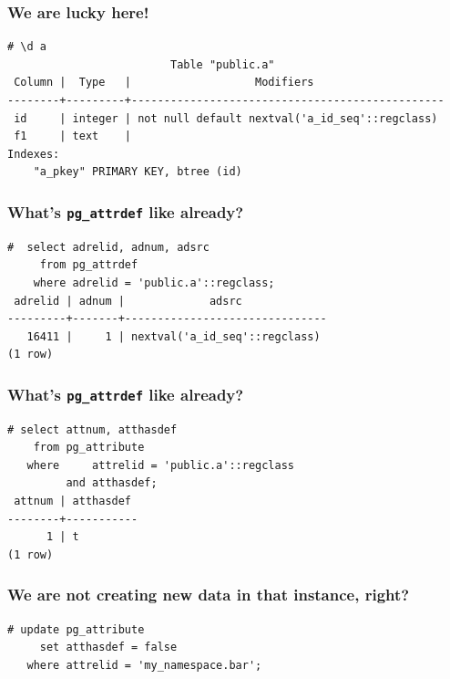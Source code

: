 \documentclass{beamer}
\begin{document}
\begin{frame}[fragile]
  \frametitle{We are lucky here!}

  \vfill

  \begin{verbatim}
# \d a
                         Table "public.a"
 Column |  Type   |                   Modifiers                    
--------+---------+------------------------------------------------
 id     | integer | not null default nextval('a_id_seq'::regclass)
 f1     | text    | 
Indexes:
    "a_pkey" PRIMARY KEY, btree (id)
  \end{verbatim}
\end{frame}

\begin{frame}[fragile]
  \frametitle{What's \texttt{pg\_attrdef} like already?}

  \begin{verbatim}
#  select adrelid, adnum, adsrc
     from pg_attrdef
    where adrelid = 'public.a'::regclass;
 adrelid | adnum |             adsrc             
---------+-------+-------------------------------
   16411 |     1 | nextval('a_id_seq'::regclass)
(1 row)
  \end{verbatim}
\end{frame}

\begin{frame}[fragile]
  \frametitle{What's \texttt{pg\_attrdef} like already?}

  \begin{verbatim}
# select attnum, atthasdef
    from pg_attribute
   where     attrelid = 'public.a'::regclass
         and atthasdef;
 attnum | atthasdef 
--------+-----------
      1 | t
(1 row)
  \end{verbatim}
\end{frame}

\begin{frame}[fragile]
  \frametitle{We are not creating new data in that instance, right?}

  \begin{verbatim}
# update pg_attribute
     set atthasdef = false
   where attrelid = 'my_namespace.bar';
  \end{verbatim}
\end{frame}
\end{document}
